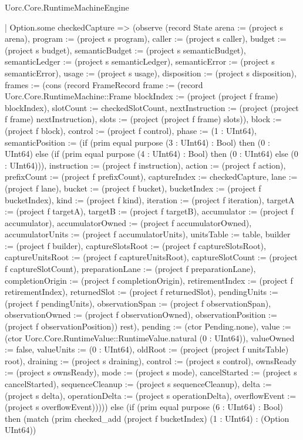 \begin{lexlean}{Uorc.Core.RuntimeMachineEngine}
\begin{semanticmodule}
{        | Option.some checkedCapture => (observe (record State {arena := (project s arena), program := (project s program), caller := (project s caller), budget := (project s budget), semanticBudget := (project s semanticBudget), semanticLedger := (project s semanticLedger), semanticError := (project s semanticError), usage := (project s usage), disposition := (project s disposition), frames := (cons (record FrameRecord {frame := (record Uorc.Core.RuntimeMachine::Frame {blockIndex := (project (project f frame) blockIndex), slotCount := checkedSlotCount, nextInstruction := (project (project f frame) nextInstruction), slots := (project (project f frame) slots)}), block := (project f block), control := (project f control), phase := (1 : UInt64), semanticPosition := (if (prim equal purpose (3 : UInt64) : Bool) then (0 : UInt64) else (if (prim equal purpose (4 : UInt64) : Bool) then (0 : UInt64) else (0 : UInt64))), instruction := (project f instruction), action := (project f action), prefixCount := (project f prefixCount), captureIndex := checkedCapture, lane := (project f lane), bucket := (project f bucket), bucketIndex := (project f bucketIndex), kind := (project f kind), iteration := (project f iteration), targetA := (project f targetA), targetB := (project f targetB), accumulator := (project f accumulator), accumulatorOwned := (project f accumulatorOwned), accumulatorUnits := (project f accumulatorUnits), unitsTable := table, builder := (project f builder), captureSlotsRoot := (project f captureSlotsRoot), captureUnitsRoot := (project f captureUnitsRoot), captureSlotCount := (project f captureSlotCount), preparationLane := (project f preparationLane), completionOrigin := (project f completionOrigin), retirementIndex := (project f retirementIndex), returnedSlot := (project f returnedSlot), pendingUnits := (project f pendingUnits), observationSpan := (project f observationSpan), observationOwned := (project f observationOwned), observationPosition := (project f observationPosition)}) rest), pending := (ctor Pending.none), value := (ctor Uorc.Core.RuntimeValue::RuntimeValue.natural (0 : UInt64)), valueOwned := false, valueUnits := (0 : UInt64), oldRoot := (project (project f unitsTable) root), draining := (project s draining), control := (project s control), ownsReady := (project s ownsReady), mode := (project s mode), cancelStarted := (project s cancelStarted), sequenceCleanup := (project s sequenceCleanup), delta := (project s delta), operationDelta := (project s operationDelta), overflowEvent := (project s overflowEvent)})))) else (if (prim equal purpose (6 : UInt64) : Bool) then (match (prim checked_add (project f bucketIndex) (1 : UInt64) : (Option UInt64))
}
\end{semanticmodule}
\end{lexlean}
